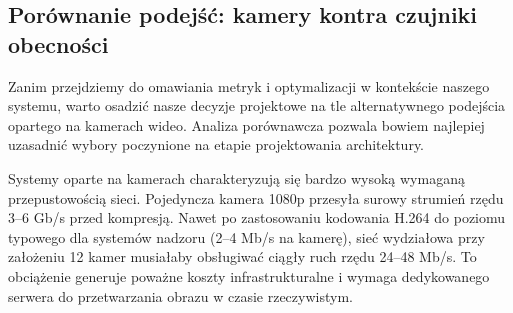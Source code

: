 \documentclass[14pt,a4paper]{extarticle}
\begin{document}
\subsection{Porównanie podejść: kamery kontra czujniki obecności}

Zanim przejdziemy do omawiania metryk i optymalizacji w kontekście naszego systemu, warto osadzić nasze decyzje projektowe na tle alternatywnego podejścia opartego na kamerach wideo. Analiza porównawcza pozwala bowiem najlepiej uzasadnić wybory poczynione na etapie projektowania architektury.

Systemy oparte na kamerach charakteryzują się bardzo wysoką wymaganą przepustowością sieci. Pojedyncza kamera 1080p przesyła surowy strumień rzędu 3--6 Gb/s przed kompresją. Nawet po zastosowaniu kodowania H.264 do poziomu typowego dla systemów nadzoru (2--4 Mb/s na kamerę), sieć wydziałowa przy założeniu 12 kamer musiałaby obsługiwać ciągły ruch rzędu 24--48 Mb/s. To obciążenie generuje poważne koszty infrastrukturalne i wymaga dedykowanego serwera do przetwarzania obrazu w czasie rzeczywistym.
\end{document}

